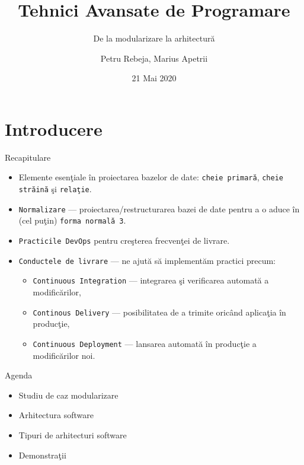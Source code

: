 \documentclass[presentation]{beamer}
\author{Petru Rebeja, Marius Apetrii}
\date{21 Mai 2020}
\title{Tehnici Avansate de Programare}
\subtitle{De la modularizare la arhitectură}
\institute[UAIC]{Facultatea de Matematică\\Universitatea Alexandru Ioan Cuza, Iași}
\begin{document}
\maketitle
\section{Introducere}
\label{sec:orgcb1410a}
\begin{frame}[label={sec:org054f002},fragile]{Recapitulare}
 \pause
\begin{itemize}
\item Elemente esenţiale în proiectarea bazelor de date: \texttt{cheie primară}, \texttt{cheie străină} şi \texttt{relaţie}.
\end{itemize}
\pause
\begin{itemize}
\item \texttt{Normalizare} --- proiectarea/restructurarea bazei de date pentru a o aduce în (cel puţin) \texttt{forma normală 3}.
\end{itemize}
\pause
\begin{itemize}
\item \texttt{Practicile DevOps} pentru creşterea frecvenţei de livrare.
\end{itemize}
\pause
\begin{itemize}
\item \texttt{Conductele de livrare} --- ne ajută să implementăm practici precum:
\begin{itemize}
\item \texttt{Continuous Integration} --- integrarea şi verificarea automată a modificărilor,
\item \texttt{Continous Delivery} --- posibilitatea de a trimite oricând aplicaţia în producţie,
\item \texttt{Continuous Deployment} --- lansarea automată în producţie a modificărilor noi.
\end{itemize}
\end{itemize}
\end{frame}
\begin{frame}[label={sec:org77d557a}]{Agenda}
\begin{itemize}
\item Studiu de caz modularizare
\item Arhitectura software
\item Tipuri de arhitecturi software
\item Demonstraţii
\end{itemize}
\end{frame}
\end{document}
